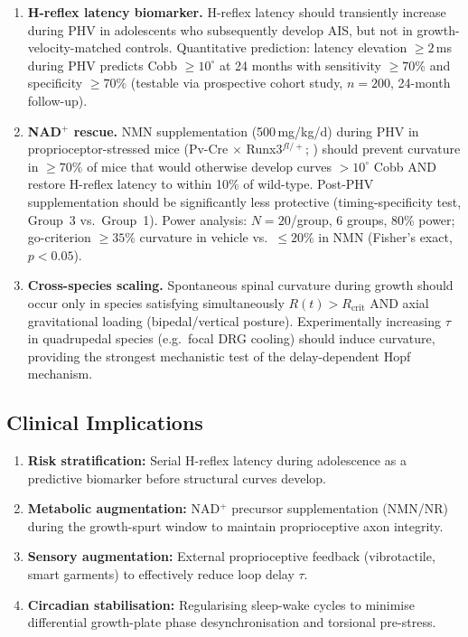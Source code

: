 \documentclass[12pt, letterpaper]{article}
\begin{document}
\begin{enumerate}[label=\textbf{P\arabic*.}]

  \item \textbf{H-reflex latency biomarker.} H-reflex latency should
    transiently increase during PHV in adolescents who subsequently develop AIS,
    but not in growth-velocity-matched controls. Quantitative prediction: latency
    elevation $\geq2$\,ms during PHV predicts Cobb $\geq10^{\circ}$ at 24
    months with sensitivity $\geq70\%$ and specificity $\geq70\%$ (testable via
    prospective cohort study, $n=200$, 24-month follow-up).

  \item \textbf{NAD$^+$ rescue.} NMN supplementation (500\,mg/kg/d) during PHV
    in proprioceptor-stressed mice (Pv-Cre $\times$ Runx3$^{fl/+}$;
    \citealt{Blecher2017}) should prevent curvature in $\geq70\%$ of mice that
    would otherwise develop curves $>10^{\circ}$ Cobb AND restore H-reflex
    latency to within 10\% of wild-type. Post-PHV supplementation should be
    significantly less protective (timing-specificity test, Group~3 vs.\
    Group~1). Power analysis: $N=20$/group, 6 groups, 80\% power; go-criterion
    $\geq35\%$ curvature in vehicle vs.\ $\leq20\%$ in NMN (Fisher's exact,
    $p<0.05$).

  \item \textbf{Cross-species scaling.} Spontaneous spinal curvature during
    growth should occur only in species satisfying simultaneously
    $R(t) > R_{\mathrm{crit}}$ AND axial gravitational loading (bipedal/vertical
    posture). Experimentally increasing $\tau$ in quadrupedal species (e.g.\
    focal DRG cooling) should induce curvature, providing the strongest
    mechanistic test of the delay-dependent Hopf mechanism.

\end{enumerate}

\subsection{Clinical Implications}

\begin{enumerate}[label=\arabic*.]
  \item \textbf{Risk stratification:} Serial H-reflex latency during adolescence
    as a predictive biomarker before structural curves develop.
  \item \textbf{Metabolic augmentation:} NAD$^{+}$ precursor supplementation
    (NMN/NR) during the growth-spurt window to maintain proprioceptive axon
    integrity.
  \item \textbf{Sensory augmentation:} External proprioceptive feedback
    (vibrotactile, smart garments) to effectively reduce loop delay $\tau$.
  \item \textbf{Circadian stabilisation:} Regularising sleep-wake cycles to
    minimise differential growth-plate phase desynchronisation and
    torsional pre-stress.
\end{enumerate}
\end{document}
